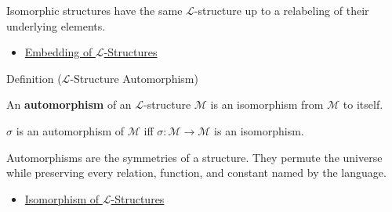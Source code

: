 \begin{remark*}[Interpretation]
Isomorphic structures have the same $\mathcal{L}$-structure up to a relabeling
of their underlying elements.
\end{remark*}

\begin{dependencies}
\begin{itemize}
  \item \hyperref[def:l-structure-embedding]{Embedding of $\mathcal{L}$-Structures}
\end{itemize}
\end{dependencies}

\begin{definitionbox}{Definition ($\mathcal{L}$-Structure Automorphism)}
\begin{definition}\label{def:l-structure-automorphism}
An \textbf{automorphism} of an $\mathcal{L}$-structure $\mathcal{M}$ is an
isomorphism from $\mathcal{M}$ to itself.
\end{definition}
\end{definitionbox}

\begin{remark*}
$\sigma$ is an automorphism of $\mathcal{M}$ iff
$\sigma\colon\mathcal{M}\to\mathcal{M}$ is an isomorphism.
\end{remark*}

\begin{remark*}[Interpretation]
Automorphisms are the symmetries of a structure. They permute the universe
while preserving every relation, function, and constant named by the language.
\end{remark*}

\begin{dependencies}
\begin{itemize}
  \item \hyperref[def:l-structure-isomorphism]{Isomorphism of $\mathcal{L}$-Structures}
\end{itemize}
\end{dependencies}

